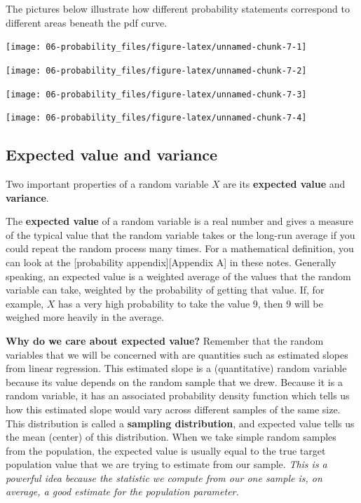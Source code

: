 \documentclass[
]{book}
\begin{document}
The pictures below illustrate how different probability statements correspond to different areas beneath the pdf curve.

\begin{center}\texttt{[image: 06-probability\_files/figure-latex/unnamed-chunk-7-1]} \end{center}

\begin{center}\texttt{[image: 06-probability\_files/figure-latex/unnamed-chunk-7-2]} \end{center}

\begin{center}\texttt{[image: 06-probability\_files/figure-latex/unnamed-chunk-7-3]} \end{center}

\begin{center}\texttt{[image: 06-probability\_files/figure-latex/unnamed-chunk-7-4]} \end{center}

\hypertarget{expected-value-and-variance}{%
\subsection{Expected value and variance}\label{expected-value-and-variance}}

Two important properties of a random variable \(X\) are its \textbf{expected value} and \textbf{variance}.

The \textbf{expected value} of a random variable is a real number and gives a measure of the typical value that the random variable takes or the long-run average if you could repeat the random process many times. For a mathematical definition, you can look at the {[}probability appendix{]}{[}Appendix A{]} in these notes. Generally speaking, an expected value is a weighted average of the values that the random variable can take, weighted by the probability of getting that value. If, for example, \(X\) has a very high probability to take the value 9, then 9 will be weighed more heavily in the average.

\textbf{Why do we care about expected value?} Remember that the random variables that we will be concerned with are quantities such as estimated slopes from linear regression. This estimated slope is a (quantitative) random variable because its value depends on the random sample that we drew. Because it is a random variable, it has an associated probability density function which tells us how this estimated slope would vary across different samples of the same size. This distribution is called a \textbf{sampling distribution}, and expected value tells us the mean (center) of this distribution. When we take simple random samples from the population, the expected value is usually equal to the true target population value that we are trying to estimate from our sample. \emph{This is a powerful idea because the statistic we compute from our one sample is, on average, a good estimate for the population parameter.}
\end{document}
